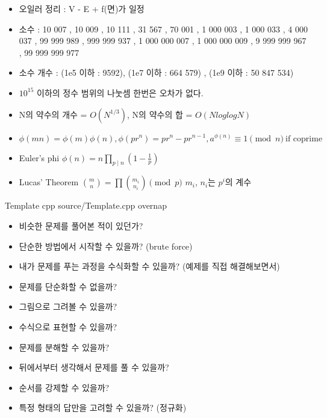 \documentclass[landscape, 10pt, a4paper, oneside, twocolumn]{extarticle}
\begin{document}
\begin{itemize}
\item 오일러 정리 : V - E + f(면)가 일정
\item 소수 : 10 007 , 10 009 , 10 111 , 31 567 , 70 001 , 1 000 003 , 1 000 033 , 4 000 037 , 99 999 989 , 999 999 937 , 1 000 000 007 , 1 000 000 009 , 9 999 999 967 , 99 999 999 977
\item 소수 개수 : (1e5 이하 : 9592), (1e7 이하 : 664 579) , (1e9 이하 : 50 847 534) 
\item $10^{15}$ 이하의 정수 범위의 나눗셈 한번은 오차가 없다.
\item N의 약수의 개수 = $O(N^{1/3})$, N의 약수의 합 = $O(NloglogN)$
\item $\phi(mn) = \phi(m) \phi(n) , \phi(pr^n) = pr^n - pr^{n-1} , a^{\phi(n)} \equiv 1 \pmod{n} \ \text{if coprime}$
\end{itemize}

\begin{itemize}  %
\item Euler's phi $\phi (n)=n\prod _{p\mid n}\left(1-{\frac {1}{p}}\right)$
\item Lucas' Theorem $\binom{m}{n}=\prod\binom{m_i}{n_i} \pmod p$ $m_i$, $n_i$는 $p^i$의 계수
\end{itemize}

\Algorithm
{Template}
{}
{}
{cpp}
{source/Template.cpp}
{overnap}


\begin{itemize}
\item 비슷한 문제를 풀어본 적이 있던가?
\item 단순한 방법에서 시작할 수 있을까? (brute force)
\item 내가 문제를 푸는 과정을 수식화할 수 있을까? (예제를 직접 해결해보면서)
\item 문제를 단순화할 수 없을까?
\item 그림으로 그려볼 수 있을까?
\item 수식으로 표현할 수 있을까?
\item 문제를 분해할 수 있을까?
\item 뒤에서부터 생각해서 문제를 풀 수 있을까?
\item 순서를 강제할 수 있을까?
\item 특정 형태의 답만을 고려할 수 있을까? (정규화)
\end{itemize}
\end{document}
